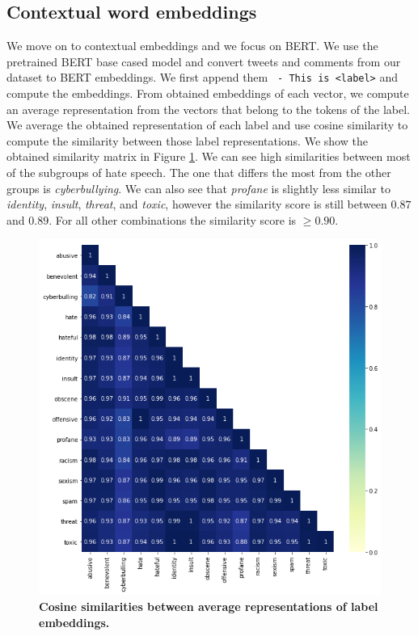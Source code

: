 \documentclass[fleqn,moreauthors,10pt]{ds_report}
\begin{document}
\subsection*{Contextual word embeddings}
We move on to contextual embeddings and we focus on BERT. We use the pretrained BERT base cased model \cite{DBPL} and convert tweets and comments from our dataset to BERT embeddings. We first append them \texttt{ - This is <label>} and compute the embeddings. From obtained embeddings of each vector, we compute an average representation from the vectors that belong to the tokens of the label. We average the obtained representation of each label and use cosine similarity to compute the similarity between those label representations. We show the obtained similarity matrix in Figure \ref{fig:bertsim1}. We can see high similarities between most of the subgroups of hate speech. The one that differs the most from the other groups is \textit{cyberbullying}. We can also see that \textit{profane} is slightly less similar to \textit{identity}, \textit{insult}, \textit{threat}, and \textit{toxic}, however the similarity score is still between $0.87$ and $0.89$. For all other combinations the similarity score is $\ge 0.90$.

\begin{figure}[htb]\centering
	\includegraphics[width=\linewidth]{bert_sim1.png}
	\caption{\textbf{Cosine similarities between average representations of label embeddings.} }
	\label{fig:bertsim1}
\end{figure}
\end{document}
